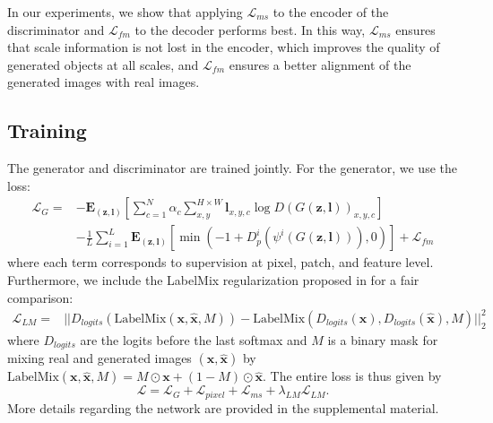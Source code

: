\documentclass{bmvc2k}
\begin{document}
In our experiments, we show that applying $\mathcal{L}_{ms}$ to the encoder of the discriminator and $\mathcal{L}_{fm}$ to the decoder performs best. In this way, $\mathcal{L}_{ms}$ ensures that scale information is not lost in the encoder, which improves the quality of generated objects at all scales, and $\mathcal{L}_{fm}$ ensures a better alignment of the generated images with real images. 










\subsection{Training}
The generator and discriminator are trained jointly. For the generator, we use the loss: 
\begin{equation}\label{eq:G}
\begin{split}
    \mathcal{L}_G = &-\mathbf{E}_{(\mathbf{z}, \mathbf{l})}\left[\sum_{c=1}^N\alpha_c \sum_{x,y}^{H\times W}\mathbf{l}_{x,y,c} \log D(G(\mathbf{z},\mathbf{l}))_{x,y,c}\right] \\
    &- \frac{1}{L} \sum_{i=1}^L \mathbf{E}_{(\mathbf{z}, \mathbf{l})} \left[\min(-1 + D^i_{p}(\psi^i(G(\mathbf{z}, \mathbf{l}))), 0)\right] + \mathcal{L}_{fm}   
\end{split}
\end{equation}
where each term corresponds to supervision at pixel, patch, and feature level. Furthermore, 
we include the LabelMix regularization proposed in \cite{schonfeld_sushko_iclr2021} for a fair comparison:
\begin{equation}
\begin{split}
    \mathcal{L}_{LM} = &||D_{logits}(\mathrm{LabelMix}(\mathbf{x}, \hat{\mathbf{x}}, M)) - \mathrm{LabelMix}(D_{logits}(\mathbf{x}), D_{logits}(\hat{\mathbf{x}}), M)||_2^2
\end{split}
\end{equation}
where $D_{logits}$ are the logits before the last softmax and $M$ is a binary mask for mixing real and generated images $(\mathbf{x}, \hat{\mathbf{x}})$ by 
$\mathrm{LabelMix}(\mathbf{x}, \hat{\mathbf{x}},M) = M \odot \mathbf{x} + (1-M) \odot \hat{\mathbf{x}}$. The entire loss is thus given by 
\begin{equation}
     \mathcal{L} = \mathcal{L}_G + \mathcal{L}_{pixel} + \mathcal{L}_{ms} + \lambda_{LM} \mathcal{L}_{LM}.
\end{equation}
More details regarding the network are provided in the supplemental material.  
\end{document}
